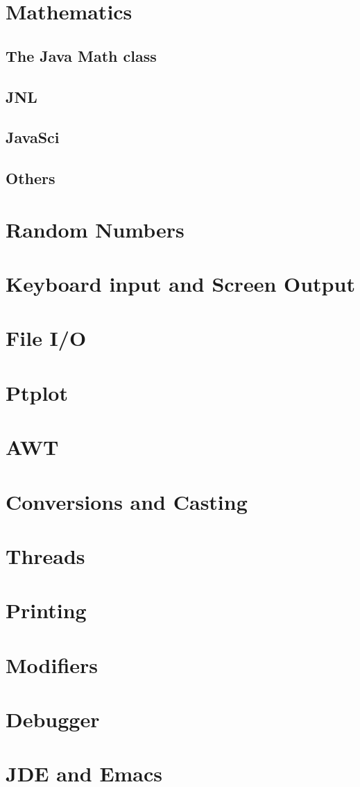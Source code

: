 \section{Mathematics}
\subsection{The Java Math class}
\subsection{JNL}
\subsection{JavaSci}
\subsection{Others}
\label{sec:Others}
\section{Random Numbers}
\section{Keyboard input and Screen Output}
\section{File I/O}
\section{Ptplot}
\section{AWT}
\section{Conversions and Casting}
\section{Threads}
\section{Printing}
\section{Modifiers}
\section{Debugger}
\section{JDE and Emacs}


